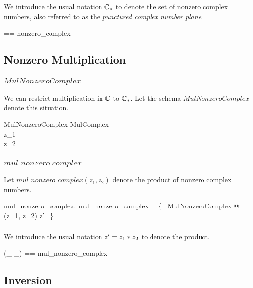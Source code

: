 \documentclass{amsart}
\begin{document}
We introduce the usual notation $\mathbb{C}_{*}$ to denote the set of nonzero complex numbers,
also referred to as the \textit{punctured complex number plane}.

\begin{zed}
	\Cnz == nonzero\_complex
\end{zed}

\subsection{Nonzero Multiplication}

\subsubsection{$MulNonzeroComplex$}

We can restrict multiplication in $\mathbb{C}$ to $\mathbb{C}_{*}$.
Let the schema $MulNonzeroComplex$ denote this situation.

\begin{schema}{MulNonzeroComplex}
	MulComplex \\
\where
	z_1 \in \Cnz \\
	z_2 \in \Cnz
\end{schema}

\subsubsection{$mul\_nonzero\_complex$}

Let $mul\_nonzero\_complex(z_1, z_2)$ denote the product of nonzero complex numbers.

\begin{axdef}
	mul\_nonzero\_complex: \Cnz \cross \Cnz \fun \Cnz
\where
	mul\_nonzero\_complex = \{~ MulNonzeroComplex @ (z_1, z_2) \mapsto z' ~\}
\end{axdef}

\subsubsection{}

We introduce the usual notation $z' = z_1 \mathbin{*} z_2$ to denote the product.

\begin{zed}
	(\_ \mulCnz \_) == mul\_nonzero\_complex
\end{zed}

\subsection{Inversion}
\end{document}
